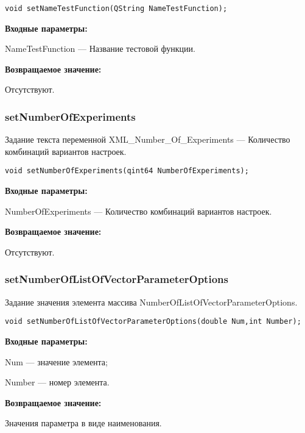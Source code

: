 \documentclass[a4paper,12pt]{article}
\begin{document}
\begin{lstlisting}[label=code_syntax_setNameTestFunction,caption=Синтаксис]
void setNameTestFunction(QString NameTestFunction);
\end{lstlisting}

\textbf{Входные параметры:}

NameTestFunction --- Название тестовой функции.

\textbf{Возвращаемое значение:}

Отсутствуют.


\subsubsection{setNumberOfExperiments}\label{setNumberOfExperiments}

Задание текста переменной  XML\_Number\_Of\_Experiments --- Количество комбинаций вариантов настроек.


\begin{lstlisting}[label=code_syntax_setNumberOfExperiments,caption=Синтаксис]
void setNumberOfExperiments(qint64 NumberOfExperiments);
\end{lstlisting}

\textbf{Входные параметры:}

NumberOfExperiments --- Количество комбинаций вариантов настроек.

\textbf{Возвращаемое значение:}

Отсутствуют.


\subsubsection{setNumberOfListOfVectorParameterOptions}\label{setNumberOfListOfVectorParameterOptions}

Задание значения элемента массива NumberOfListOfVectorParameterOptions.


\begin{lstlisting}[label=code_syntax_setNumberOfListOfVectorParameterOptions,caption=Синтаксис]
void setNumberOfListOfVectorParameterOptions(double Num,int Number);
\end{lstlisting}

\textbf{Входные параметры:}

Num --- значение элемента;

Number --- номер элемента.

\textbf{Возвращаемое значение:}

Значения параметра в виде наименования.
\end{document}
